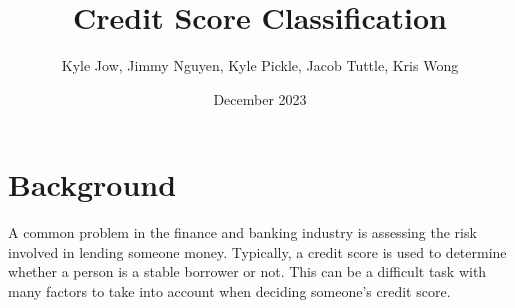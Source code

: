 \documentclass[11pt]{article}
\title{\textbf{Credit Score Classification}}
\author{Kyle Jow, Jimmy Nguyen, Kyle Pickle, Jacob Tuttle, Kris Wong}
\date{December 2023}
\begin{document}
\maketitle
\newpage
{}
\pagestyle{fancy}
\fancyhf{} %
\fancyfoot[R]{\thepage}
\section*{Background}
A common problem in the finance and banking industry is assessing the risk 
involved in lending someone money. Typically, a credit score is used to determine 
whether a person is a stable borrower or not. This can be a difficult task with 
many factors to take into account when deciding someone's credit score.
\end{document}
